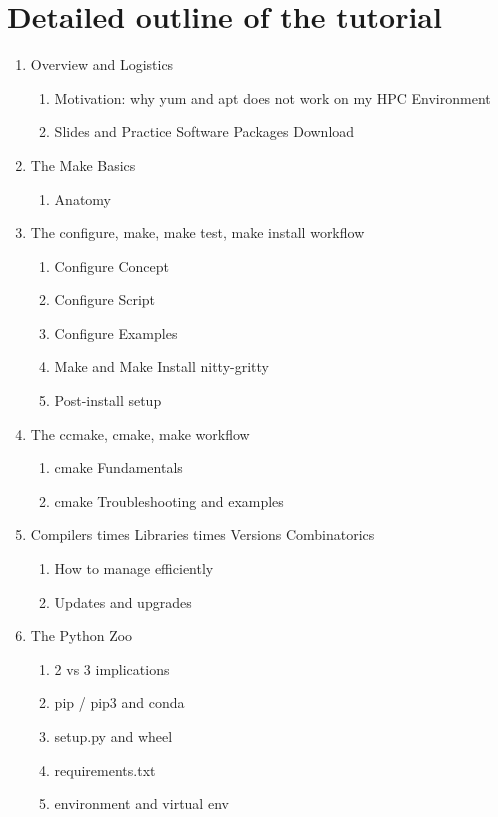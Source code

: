 \documentclass{report}
\begin{document}
\section*{Detailed outline of the tutorial}
\begin{enumerate}
\item Overview and Logistics
  \begin{enumerate}
    \item Motivation: why yum and apt does not work on my HPC Environment
    \item Slides and Practice Software Packages Download
  \end{enumerate}
\item The Make Basics
  \begin{enumerate}
    \item Anatomy
  \end{enumerate}
\item The configure, make, make test, make install workflow
  \begin{enumerate}
    \item Configure Concept
    \item Configure Script
    \item Configure Examples
    \item Make and Make Install nitty-gritty
    \item Post-install setup
  \end{enumerate}
\item The ccmake, cmake, make workflow
    \begin{enumerate}
      \item cmake Fundamentals
      \item cmake Troubleshooting and examples
    \end{enumerate}
\item Compilers times Libraries times Versions Combinatorics
  \begin{enumerate}
    \item How to manage efficiently
    \item Updates and upgrades
  \end{enumerate}
\item The Python Zoo
  \begin{enumerate}
    \item 2 vs 3 implications
    \item pip / pip3 and conda
    \item setup.py and wheel
    \item requirements.txt
    \item environment and virtual env

\end{enumerate}
\end{enumerate}
\end{document}
